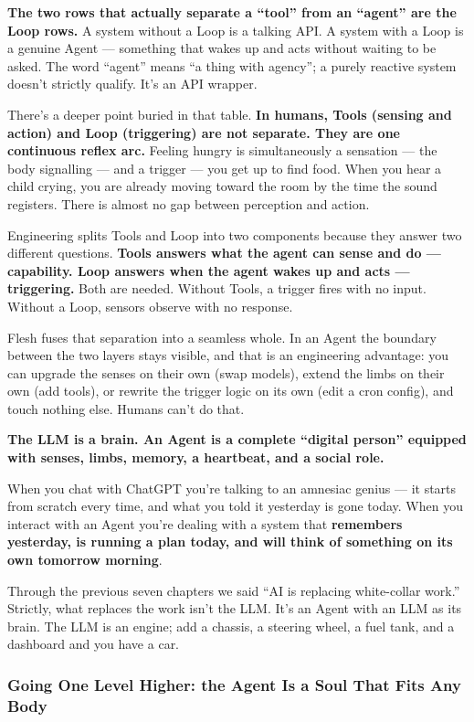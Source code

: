 \documentclass[11pt,a4paper]{article}
\begin{document}
\textbf{The two rows that actually separate a ``tool'' from an ``agent'' are the Loop rows.} A system without a Loop is a talking API. A system with a Loop is a genuine Agent --- something that wakes up and acts without waiting to be asked. The word ``agent'' means ``a thing with agency''; a purely reactive system doesn't strictly qualify. It's an API wrapper.

There's a deeper point buried in that table. \textbf{In humans, Tools (sensing and action) and Loop (triggering) are not separate. They are one continuous reflex arc.} Feeling hungry is simultaneously a sensation --- the body signalling --- and a trigger --- you get up to find food. When you hear a child crying, you are already moving toward the room by the time the sound registers. There is almost no gap between perception and action.

Engineering splits Tools and Loop into two components because they answer two different questions. \textbf{Tools answers what the agent can sense and do --- capability. Loop answers when the agent wakes up and acts --- triggering.} Both are needed. Without Tools, a trigger fires with no input. Without a Loop, sensors observe with no response.

Flesh fuses that separation into a seamless whole. In an Agent the boundary between the two layers stays visible, and that is an engineering advantage: you can upgrade the senses on their own (swap models), extend the limbs on their own (add tools), or rewrite the trigger logic on its own (edit a cron config), and touch nothing else. Humans can't do that.

\textbf{The LLM is a brain. An Agent is a complete ``digital person'' equipped with senses, limbs, memory, a heartbeat, and a social role.}

When you chat with ChatGPT you're talking to an amnesiac genius --- it starts from scratch every time, and what you told it yesterday is gone today. When you interact with an Agent you're dealing with a system that \textbf{remembers yesterday, is running a plan today, and will think of something on its own tomorrow morning}.

Through the previous seven chapters we said ``AI is replacing white-collar work.'' Strictly, what replaces the work isn't the LLM. It's an Agent with an LLM as its brain. The LLM is an engine; add a chassis, a steering wheel, a fuel tank, and a dashboard and you have a car.

\subsubsection{Going One Level Higher: the Agent Is a Soul That Fits Any Body}
\end{document}
